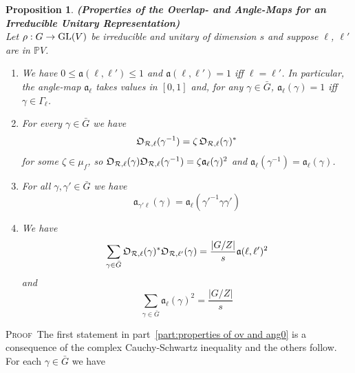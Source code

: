 \documentclass[12pt]{article}
\newtheorem{prop}{Proposition}[section]
\newcommand{\bbP}{\ensuremath{\mathbb{P}}}
\newcommand{\bPf}{\noindent \textsc{Proof\ }}
\newcommand{\cR}{\ensuremath{\mathcal{R}}}
\newcommand{\fa}{\ensuremath{\mathfrak{a}}}
\newcommand{\GL}{{\rm GL}}
\newcommand{\inv}{^{-1}}%
\newcommand{\barG}{\ensuremath{\bar{G}}}
\newcommand{\cAng}{{\frak O}}
\begin{document}
\begin{prop}{\bf (Properties of the Overlap- and  Angle-Maps for an Irreducible Unitary Representation)}
\label{prop: properties of ov and ang}	\ \\
Let $\rho:G\rightarrow \GL(V)$ be irreducible and unitary of dimension $s$ and suppose $\ell$, $\ell'$ are in $\bbP V$. 
\begin{enumerate}
\item\label{part:properties of ov and ang0} We have 
 $0\leq \fa(\ell,\ell')\leq 1$ and $\fa(\ell,\ell')=1$ iff $\ell=\ell'$. In particular, the  angle-map $\fa_\ell$ takes values in $[0,1]$ and, for any $\gamma\in\barG$,  $\fa_\ell(\gamma)=1$ iff $\gamma\in \Gamma_\ell$. 
 \item\label{part:properties of ov and ang1} 
For every  $\gamma\in\barG$ we have 
\begin{equation}\label{eq: ov of inverse}
	\cAng_{\cR,\ell}(\gamma\inv)=
	\zeta\,\cAng_{\cR,\ell}(\gamma)^\ast
\end{equation}
for some $\zeta\in \mu_f$, 
so $\cAng_{\cR,\ell}(\gamma)\cAng_{\cR,\ell}(\gamma\inv)=\zeta\fa_{\ell}(\gamma)^2$ and 
$ 
\fa_{\ell}(\gamma\inv)=
\fa_{\ell}(\gamma)
$. 
\item\label{part:properties of ov and ang2.5} For all $\gamma,\gamma'\in \bar G$ we have 
\begin{equation}\label{eq: angle map on conjugates/image of line}
	\fa_{\gamma'\ell}(\gamma)=
	\fa_{\ell}({\gamma'}\inv \gamma \gamma')
\end{equation}
\item\label{part:properties of ov and ang2}
We have
\begin{equation}\label{eq:pre-Clinometric}
\sum_{\gamma\in\bar{G}}
\cAng_{\cR,\ell}(\gamma)^\ast\cAng_{\cR,\ell'}(\gamma)=
\frac{|G/Z|}{s}\fa(\ell,\ell')^2
\end{equation}
and \\
\begin{equation}\label{eq: The Clinometric Relation}
	\sum_{\gamma\in\bar{G}}
	\fa_{\ell}(\gamma)^2=
	\frac{|G/Z|}{s}
\end{equation}
\end{enumerate}
\end{prop}
\bPf The first statement in part~\ref{part:properties of ov and ang0} is a consequence of the complex Cauchy-Schwartz inequality and the others follow. For each $\gamma\in\barG$ we have 
\end{document}
